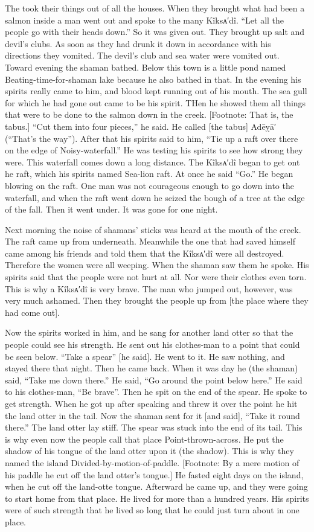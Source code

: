 The took their things out of all the houses.
When they brought what had been a salmon inside a man went out and spoke to the many Kîksᴀ′dî. “Let all the people go with their heads down.” So it was given out.
They brought up salt and devil’s clubs.
As soon as they had drunk it down in accordance with his directions they vomited.
The devil’s club and sea water were vomited out.
Toward evening the shaman bathed.
Below this town is a little pond named Beating-time-for-shaman lake because he also bathed in that.
In the evening his spirits really came to him, and blood kept running out of his mouth.
The sea gull for which he had gone out came to be his spirit.
THen he showed them all things that were to be done to the salmon down in the creek. [Footnote: That is, the tabus.] “Cut them into four pieces,” he said.
He called [the tabus] Adēỵā′ (“That’s the way”).
After that his spirits said to him, “Tie up a raft over there on the edge of Noisy-waterfall.” He was testing his spirits to see how strong they were.
This waterfall comes down a long distance.
The Kîksᴀ′dî began to get ont he raft, which his spirits named Sea-lion raft.
At once he said “Go.” He began blowing on the raft.
One man was not courageous enough to go down into the waterfall, and when the raft went down he seized the bough of a tree at the edge of the fall.
Then it went under.
It was gone for one night.

Next morning the noise of shamans’ sticks was heard at the mouth of the creek.
The raft came up from underneath.
Meanwhile the one that had saved himself came among his friends and told them that the Kîksᴀ′dî were all destroyed.
Therefore the women were all weeping.
When the shaman saw them he spoke.
His spirits said that the people were not hurt at all.
Nor were their clothes even torn.
This is why a Kîksᴀ′dî is very brave.
The man who jumped out, however, was very much ashamed.
Then they brought the people up from [the place where they had come out].

Now the spirits worked in him, and he sang for another land otter so that the people could see his strength.
He sent out his clothes-man to a point that could be seen below. “Take a spear” [he said].
He went to it.
He saw nothing, and stayed there that night.
Then he came back.
When it was day he (the shaman) said, “Take me down there.” He said, “Go around the point below here.” He said to his clothes-man, “Be brave”.
Then he spit on the end of the spear.
He spoke to get strength.
When he got up after speaking and threw it over the point he hit the land otter in the tail.
Now the shaman sent for it [and said], “Take it round there.” The land otter lay stiff.
The spear was stuck into the end of its tail.
This is why even now the people call that place Point-thrown-across.
He put the shadow of his tongue of the land otter upon it (the shadow).
This is why they named the island Divided-by-motion-of-paddle. [Footnote: By a mere motion of his paddle he cut off the land otter’s tongue.] He fasted eight days on the island, when he cut off the land-otte tongue.
Afterward he came up, and they were going to start home from that place.
He lived for more than a hundred years.
His spirits were of such strength that he lived so long that he could just turn about in one place.

